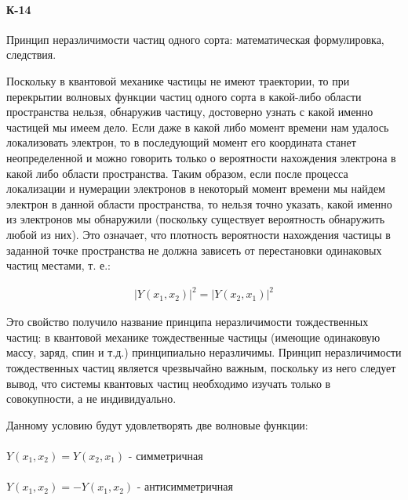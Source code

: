 \documentclass[__main__.tex]{subfiles}
\begin{document}
\paragraph{К-14}
Принцип неразличимости частиц одного сорта: математическая формулировка, следствия.


Поскольку в квантовой механике частицы не имеют траектории, то при перекрытии волновых функции частиц одного сорта в какой-либо области пространства нельзя, обнаружив частицу, достоверно узнать с какой именно частицей мы имеем дело. Если даже в какой либо момент времени нам удалось локализовать электрон, то в последующий момент его координата станет неопределенной и можно говорить только о вероятности нахождения электрона в какой либо области пространства. Таким образом, если после процесса локализации и нумерации электронов в некоторый момент времени мы найдем электрон в данной области пространства, то нельзя точно указать, какой именно из электронов мы обнаружили (поскольку существует вероятность обнаружить любой из них). Это означает, что плотность вероятности  нахождения частицы в заданной точке пространства не должна зависеть от перестановки одинаковых частиц местами, т. е.:

\begin{gather*}
	|Y(x_1,x_2)|^2 = |Y(x_2,x_1)|^2
\end{gather*}

Это свойство получило название принципа неразличимости тождественных частиц: в квантовой механике тождественные частицы (имеющие одинаковую массу, заряд, спин и т.д.) принципиально неразличимы. Принцип неразличимости тождественных частиц является чрезвычайно важным, поскольку	из него следует вывод, что системы квантовых частиц необходимо изучать только в совокупности, а не индивидуально.

Данному условию будут удовлетворять две волновые функции:\\\\
$Y(x_1,x_2) = Y(x_2,x_1)$ - симметричная\\\\
$Y(x_1,x_2) = -Y(x_1,x_2)$ - антисимметричная
\end{document}
